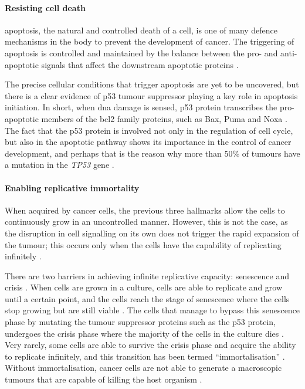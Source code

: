\paragraph{Resisting cell death}

\noindent
\Gls{apoptosis}, the natural and controlled death of a cell, is one of many defence mechanisms in the body to prevent the development of cancer.
The triggering of \gls{apoptosis} is controlled and maintained by the balance between the pro- and anti-apoptotic signals that affect the downstream apoptotic proteins \citep{Hanahan2011}.

The precise cellular conditions that trigger apoptosis are yet to be uncovered, but there is a clear evidence of p53 tumour suppressor playing a key role in apoptosis initiation.
In short, when \acrshort{dna} damage is sensed, p53 protein transcribes the pro-apoptotic members of the \gls{bcl2} family proteins, such as Bax, Puma and Noxa \citep{Fridman2003,Hanahan2011}.
The fact that the p53 protein is involved not only in the regulation of cell cycle, but also in the apoptotic pathway shows its importance in the control of cancer development, and perhaps that is the reason why more than 50\% of tumours have a mutation in the \textit{TP53} gene \citep{Levine1997}.

\paragraph{Enabling replicative immortality}

\noindent
When acquired by cancer cells, the previous three hallmarks allow the cells to continuously grow in an uncontrolled manner.
However, this is not the case, as the disruption in cell signalling on its own does not trigger the rapid expansion of the tumour; this occurs only when the cells have the capability of replicating infinitely \citep{Hanahan2000, Hanahan2011}.

There are two barriers in achieving infinite replicative capacity: senescence and crisis \citep{Hanahan2011}.
When cells are grown in a culture, cells are able to replicate and grow until a certain point, and the cells reach the stage of senescence where the cells stop growing but are still viable \citep{Hanahan2011}.
The cells that manage to bypass this senescence phase by mutating the tumour suppressor proteins such as the p53 protein, undergoes the crisis phase where the majority of the cells in the culture dies \citep{Hanahan2011}.
Very rarely, some cells are able to survive the crisis phase and acquire the ability to replicate infinitely, and this transition has been termed ``immortalisation'' \citep{Hanahan2011, Wright1989}.
Without immortalisation, cancer cells are not able to generate a macroscopic tumours that are capable of killing the host organism \citep{Hanahan2000,Hanahan2011}.

